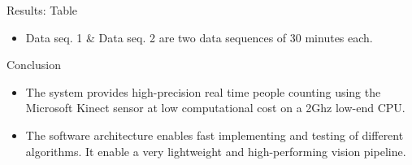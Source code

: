 \documentclass[final,hyperref={pdfpagelabels=false}]{beamer}
\begin{document}
\begin{frame}[t]
\begin{columns}[t]
\begin{column}{.465\textwidth}
\begin{block}{Results: Table}
\begin{itemize}
\item Data seq. 1 \& Data seq. 2 are two data sequences of 30 minutes each. 
\end{itemize}
     
\end{block}






\begin{block}{Conclusion}

\begin{itemize}
\item The system provides high-precision real time people counting using the Microsoft Kinect sensor at low computational cost on a 2Ghz low-end CPU.
\item The software architecture enables fast implementing and testing of different algorithms. It enable a very lightweight and high-performing vision pipeline. 
\end{itemize}

\end{block}

%
%        
%
%
%
%
%


\end{column}
\end{columns}
\end{frame}
\end{document}
